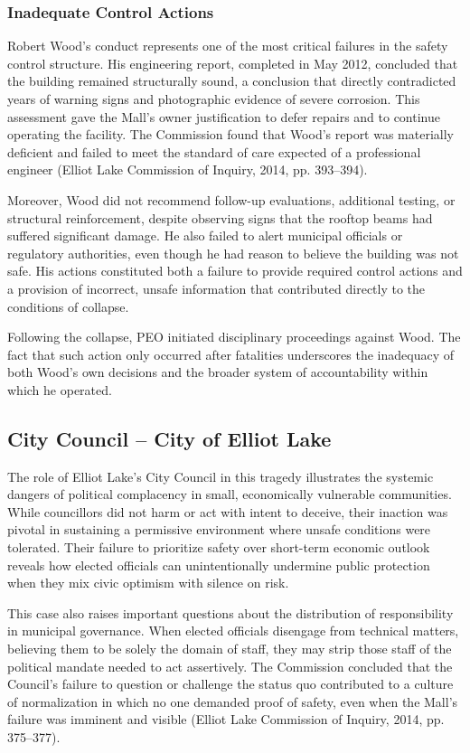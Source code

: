 \documentclass[12pt]{article}
\begin{document}
\subsubsection*{Inadequate Control Actions}
Robert Wood’s conduct represents one of the most critical failures in the safety control structure. His engineering report, completed in May 2012, concluded that the building remained structurally sound, a conclusion that directly contradicted years of warning signs and photographic evidence of severe corrosion. This assessment gave the Mall’s owner justification to defer repairs and to continue operating the facility. The Commission found that Wood’s report was materially deficient and failed to meet the standard of care expected of a professional engineer (Elliot Lake Commission of Inquiry, 2014, pp. 393–394).

Moreover, Wood did not recommend follow-up evaluations, additional testing, or structural reinforcement, despite observing signs that the rooftop beams had suffered significant damage. He also failed to alert municipal officials or regulatory authorities, even though he had reason to believe the building was not safe. His actions constituted both a failure to provide required control actions and a provision of incorrect, unsafe information that contributed directly to the conditions of collapse.

Following the collapse, PEO initiated disciplinary proceedings against Wood. The fact that such action only occurred after fatalities underscores the inadequacy of both Wood’s own decisions and the broader system of accountability within which he operated.

\subsection{City Council – City of Elliot Lake}
The role of Elliot Lake’s City Council in this tragedy illustrates the systemic dangers of political complacency in small, economically vulnerable communities. While councillors did not harm or act with intent to deceive, their inaction was pivotal in sustaining a permissive environment where unsafe conditions were tolerated. Their failure to prioritize safety over short-term economic outlook reveals how elected officials can unintentionally undermine public protection when they mix civic optimism with silence on risk.

This case also raises important questions about the distribution of responsibility in municipal governance. When elected officials disengage from technical matters, believing them to be solely the domain of staff, they may strip those staff of the political mandate needed to act assertively. The Commission concluded that the Council’s failure to question or challenge the status quo contributed to a culture of normalization in which no one demanded proof of safety, even when the Mall’s failure was imminent and visible (Elliot Lake Commission of Inquiry, 2014, pp. 375–377).
\end{document}
